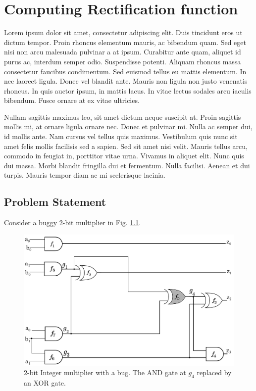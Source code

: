 \chapter{Computing Rectification function}
\label{ch:rectfunc}
Lorem ipsum dolor sit amet, consectetur adipiscing elit. Duis tincidunt eros ut dictum tempor. Proin rhoncus elementum mauris, ac bibendum quam. Sed eget nisi non arcu malesuada pulvinar a at ipsum. Curabitur ante quam, aliquet id purus ac, interdum semper odio. Suspendisse potenti. Aliquam rhoncus massa consectetur faucibus condimentum. Sed euismod tellus eu mattis elementum. In nec laoreet ligula. Donec vel blandit ante. Mauris non ligula non justo venenatis rhoncus. In quis auctor ipsum, in mattis lacus. In vitae lectus sodales arcu iaculis bibendum. Fusce ornare at ex vitae ultricies.

Nullam sagittis maximus leo, sit amet dictum neque suscipit at. Proin sagittis mollis mi, at ornare ligula ornare nec. Donec et pulvinar mi. Nulla ac semper dui, id mollis ante. Nam cursus vel tellus quis maximus. Vestibulum quis nunc sit amet felis mollis facilisis sed a sapien. Sed sit amet nisi velit. Mauris tellus arcu, commodo in feugiat in, porttitor vitae urna. Vivamus in aliquet elit. Nunc quis dui massa. Morbi blandit fringilla dui et fermentum. Nulla facilisi. Aenean et dui turpis. Mauris tempor diam ac mi scelerisque lacinia.

\section{Problem Statement}

\begin{Example}
Consider a buggy 2-bit multiplier in Fig. \ref{fig:mult2_b2}. 

\begin{figure}[H]
    \centering
    \includegraphics[scale = 0.2]{mult2_b.png}
    \caption{2-bit Integer multiplier with a bug. The AND gate at $g_4$ replaced by an XOR gate.}
    \label{fig:mult2_b2}
\end{figure}

\end{Example}


